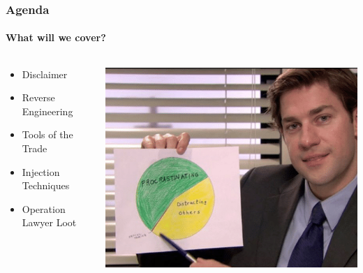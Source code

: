 \documentclass[aspectratio=169]{beamer}
\begin{document}
\begin{frame}
  \frametitle{Agenda}
  \framesubtitle{What will we cover?}
  \begin{columns}[onlytextwidth]
    \begin{column}{.50\textwidth}
      \begin{itemize}
      \item{Disclaimer}
      \item{Reverse Engineering}
      \item{Tools of the Trade}
      \item{Injection Techniques}
      \item{Operation Lawyer Loot}
      \end{itemize}
    \end{column}
    \hfill
    \begin{column}{.50\textwidth}
      \begin{center}
        \includegraphics[scale=1.8]{agenda-meme}
      \end{center}
    \end{column}
  \end{columns}
\end{frame}
\end{document}
